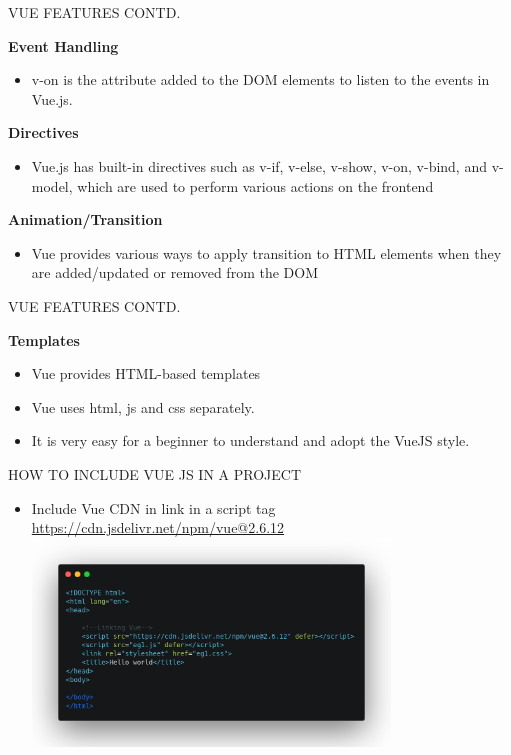 \documentclass[aspectratio=169, 169]{beamer}
\newcommand\myheading[1]{%
  \par\bigskip
  {\Large\bfseries#1}\par\smallskip}
\begin{document}
\begin{frame}{VUE FEATURES CONTD.}
 \myheading{Event Handling}
  \begin{itemize}
      \item v-on is the attribute added to the DOM elements to listen to the events in Vue.js.
  \end{itemize}
  \myheading{Directives}
  \begin{itemize}
      \item Vue.js has built-in directives such as v-if, v-else, v-show, v-on, v-bind, and v-model, which are used to perform various actions on the frontend
  \end{itemize}
   \myheading{Animation/Transition}
  \begin{itemize}
      \item Vue provides various ways to apply transition to HTML elements when they are added/updated or removed from the DOM
  \end{itemize}
\end{frame}
\begin{frame}{VUE FEATURES CONTD.}
 \myheading{Templates}
 \begin{itemize}
     \item Vue provides HTML-based templates
     \item Vue uses html, js and css separately. 
     \item It is very easy for a beginner to understand and adopt the VueJS style.
 \end{itemize}
    
\end{frame}

\begin{frame}{HOW TO INCLUDE VUE JS IN A PROJECT}
\justifying
\begin{itemize}
   \item Include Vue CDN in link in a script tag
   \center\larege\url{https://cdn.jsdelivr.net/npm/vue@2.6.12}
   \includegraphics[width=9.5cm]{vueSetup.png}
   \end{itemize}
  
    
\end{frame}
\end{document}
